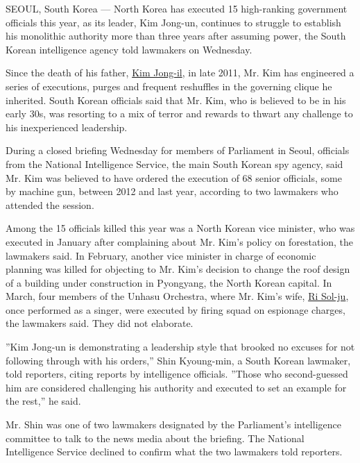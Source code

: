 SEOUL, South Korea --- North Korea has executed 15 high-ranking
government officials this year, as its leader, Kim Jong-un, continues to
struggle to establish his monolithic authority more than three years
after assuming power, the South Korean intelligence agency told
lawmakers on Wednesday.

Since the death of his father,
\href{http://www.nytimes.com/2011/12/19/world/asia/Kim-Jong-il-Dictator-Who-Turned-North-Korea-Into-a-Nuclear-State-Dies.html}{Kim
Jong-il}, in late 2011, Mr. Kim has engineered a series of executions,
purges and frequent reshuffles in the governing clique he inherited.
South Korean officials said that Mr. Kim, who is believed to be in his
early 30s, was resorting to a mix of terror and rewards to thwart any
challenge to his inexperienced leadership.

During a closed briefing Wednesday for members of Parliament in Seoul,
officials from the National Intelligence Service, the main South Korean
spy agency, said Mr. Kim was believed to have ordered the execution of
68 senior officials, some by machine gun, between 2012 and last year,
according to two lawmakers who attended the session.

Among the 15 officials killed this year was a North Korean vice
minister, who was executed in January after complaining about Mr. Kim's
policy on forestation, the lawmakers said. In February, another vice
minister in charge of economic planning was killed for objecting to Mr.
Kim's decision to change the roof design of a building under
construction in Pyongyang, the North Korean capital. In March, four
members of the Unhasu Orchestra, where Mr. Kim's wife,
\href{http://www.nytimes.com/2012/07/26/world/asia/north-korean-leader-marries-reports-say.html}{Ri
Sol-ju}, once performed as a singer, were executed by firing squad on
espionage charges, the lawmakers said. They did not elaborate.

''Kim Jong-un is demonstrating a leadership style that brooked no
excuses for not following through with his orders,'' Shin Kyoung-min, a
South Korean lawmaker, told reporters, citing reports by intelligence
officials. ''Those who second-guessed him are considered challenging his
authority and executed to set an example for the rest,'' he said.

Mr. Shin was one of two lawmakers designated by the Parliament's
intelligence committee to talk to the news media about the briefing. The
National Intelligence Service declined to confirm what the two lawmakers
told reporters.

